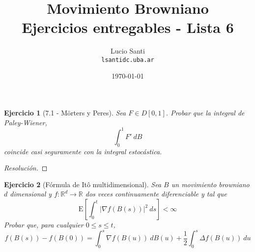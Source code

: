 \documentclass[a4paper,11pt]{article}
\title{Movimiento Browniano\\
      \small{Ejercicios entregables - Lista 6}}
\author{Lucio Santi\\
        \texttt{lsanti\at dc.uba.ar}}
\date{\today}
\newcommand{\abs}[1]{\ensuremath{\left\lvert #1 \right\rvert}}
\newcommand{\Exp}[1]{\ensuremath{\textrm{E}\left[#1\right]}}
\newcommand{\Real}{\mathbb{R}}
\newcommand{\Grad}[1]{\nabla #1}
\newcommand{\Lap}[1]{\Delta #1 }
\newcommand{\Dif}[1]{d #1}
\newtheorem*{ej}{Ejercicio}
\begin{document}
\maketitle

\begin{ej}[7.1 - Mörters y Peres] 
Sea $F \in D[0,1]$. Probar que la integral de Paley-Wiener,
$$\int_0^1{F' ~\Dif{B}}$$
coincide casi seguramente con la integral estocástica.
\end{ej}

\begin{proof}[Resoluci\'on]

\end{proof}


\begin{ej}[Fórmula de Itô multidimensional] 
Sea $B$ un movimiento browniano $d$ dimensional y $f : \Real^d \to \Real$ dos veces continuamente
diferenciable y tal que
$$\Exp{ \int_0^t{\abs{\Grad{f(B(s))}}}^2 ~\Dif{s}} < \infty$$
Probar que, para cualquier $0 \leq s \leq t$,
$$f(B(s)) - f(B(0)) = \int_0^s{\Grad{f(B(u))} ~\Dif{B(u)}} + \frac{1}{2} \int_0^s{\Lap{f(B(u))} ~\Dif{u}}$$
\end{ej}
\end{document}
